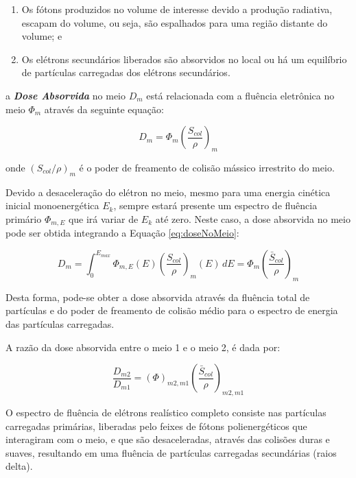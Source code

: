 \documentclass[11pt,a4paper]{article}
\begin{document}
		\begin{enumerate}
			\item Os fótons produzidos no volume de interesse devido a produção radiativa, escapam do volume, ou seja, são espalhados para uma região distante do volume; e
			\item Os elétrons secundários liberados são absorvidos no local ou há um equilíbrio de partículas carregadas dos elétrons secundários.
		\end{enumerate}

		\noindent a \textbf{\textit{\textcolor{CarnationPink}{Dose Absorvida}}} no meio $D_{m}$ está relacionada com a fluência eletrônica no meio $\Phi_{m}$ através da seguinte equação:

			\begin{equation}
				D_m = \Phi_m \left(\frac{S_{col}}{\rho}\right)_m
				\label{eq:doseNoMeio}
			\end{equation}

		\noindent onde $(S_{col}/\rho)_m$ é o poder de freamento de colisão mássico irrestrito do meio.

		Devido a desaceleração do elétron no meio, mesmo para uma energia cinética inicial monoenergética $E_k$, sempre estará presente um espectro de fluência primário $\Phi_{m,E}$ que irá variar de $E_k$ até zero. Neste caso, a dose absorvida no meio pode ser obtida integrando a Equação \ref{eq:doseNoMeio}:

			\begin{equation}
				D_{m}= \int_{0}^{E_{max}} \Phi_{m, E}(E)\left(\frac{S_{col}}{\rho}\right)_{m}(E)  \,dE
				= \Phi_m \left(\frac{\bar{S}_{col}}{\rho}\right)_m
				\label{eq:doseAbsorvidaNoMeio}
			\end{equation}

		Desta forma, pode-se obter a dose absorvida através da fluência total de partículas e do poder de freamento de colisão médio para o espectro de energia das partículas carregadas. 

		A razão da dose absorvida entre o meio 1 e o meio 2, é dada por:

			\begin{equation}
				\frac{D_{m2}}{D_{m1}} = (\Phi)_{m2,m1} \left(\frac{\bar{S}_{col}}{\rho}\right)_{m2,m1}
			\end{equation}


		O espectro de fluência de elétrons realístico completo consiste nas partículas carregadas primárias, liberadas pelo feixes de fótons polienergéticos que interagiram com o meio, e que são desaceleradas, através das colisões duras e suaves, resultando em uma fluência de partículas carregadas secundárias (raios delta). 
		
\end{document}
